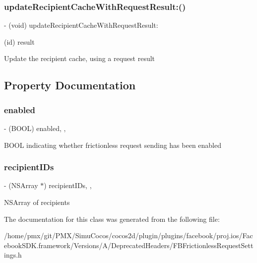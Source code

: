 \subsubsection{\texorpdfstring{update\+Recipient\+Cache\+With\+Request\+Result\+:()}{updateRecipientCacheWithRequestResult:()}\hspace{0.1cm}{\footnotesize\ttfamily [2/2]}}
{\footnotesize\ttfamily -\/ (void) update\+Recipient\+Cache\+With\+Request\+Result\+: \begin{DoxyParamCaption}\item[{(id)}]{result }\end{DoxyParamCaption}}

Update the recipient cache, using a request result 

\subsection{Property Documentation}
\mbox{\label{interfaceFBFrictionlessRequestSettings_aeed84a79e1c4fbb28c6ff3ce1702e479}} 
\subsubsection{\texorpdfstring{enabled}{enabled}}
{\footnotesize\ttfamily -\/ (B\+O\+OL) enabled\hspace{0.3cm}{\ttfamily [read]}, {\ttfamily [nonatomic]}, {\ttfamily [assign]}}

B\+O\+OL indicating whether frictionless request sending has been enabled \mbox{\label{interfaceFBFrictionlessRequestSettings_adf23a29dc2c07277762cbacf5c5a21a8}} 
\subsubsection{\texorpdfstring{recipient\+I\+Ds}{recipientIDs}}
{\footnotesize\ttfamily -\/ (N\+S\+Array $\ast$) recipient\+I\+Ds\hspace{0.3cm}{\ttfamily [read]}, {\ttfamily [nonatomic]}, {\ttfamily [assign]}}

N\+S\+Array of recipients 

The documentation for this class was generated from the following file\+:\begin{DoxyCompactItemize}
\item 
/home/pmx/git/\+P\+M\+X/\+Simu\+Cocos/cocos2d/plugin/plugins/facebook/proj.\+ios/\+Facebook\+S\+D\+K.\+framework/\+Versions/\+A/\+Deprecated\+Headers/F\+B\+Frictionless\+Request\+Settings.\+h\end{DoxyCompactItemize}
